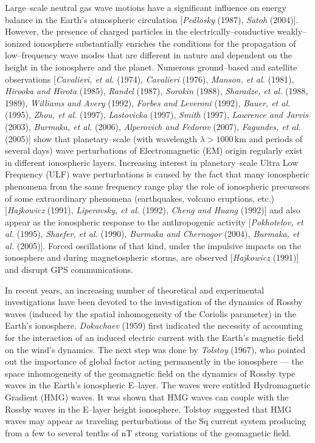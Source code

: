 \documentclass[a4paper,openany,12pt]{report}
\begin{document}
Large--scale neutral gas wave motions have a significant influence on energy balance in the Earth's atmospheric circulation [\emph{Pedlosky} (1987), \emph{Satoh} (2004)]. However, the presence of charged particles in the electrically--conductive weakly--ionized ionosphere substantially enriches the conditions for the propagation of low--frequency wave modes that are different in nature and dependent on the height in the ionosphere and the planet. Numerous ground--based and satellite observations [\emph{Cavalieri, et al.} (1974), \emph{Cavalieri} (1976), \emph{Manson, et al.} (1981), \emph{Hirooka and Hirota} (1985), \emph{Randel} (1987), \emph{Sorokin} (1988), \emph{Sharadze, et al.} (1988, 1989), \emph{Williams and Avery} (1992), \emph{Forbes and Leveroni} (1992), \emph{Bauer, et al.} (1995), \emph{Zhou, et al.} (1997), \emph{Lastovicka} (1997), \emph{Smith} (1997), \emph{Lawrence and Jarvis} (2003), \emph{Burmaka, et al.} (2006), \emph{Alperovich and Fedorov} (2007), \emph{Fagundes, et al.} (2005)] show that planetary--scale (with wavelength $\lambda>1000\,$km and periods of several days) wave perturbations of Electromagnetic (EM) origin regularly exist in different ionospheric layers. Increasing interest in planetary--scale Ultra Low Frequency (ULF) wave perturbations is caused by the fact that many ionospheric phenomena from the same frequency range play the role of ionospheric precursors of some extraordinary phenomena (earthquakes, volcano eruptions, etc.) [\emph{Hajkowicz} (1991), \emph{Liperovsky, et al.} (1992), \emph{Cheng and Huang} (1992)] and also appear as the ionospheric response to the anthropogenic activity [\emph{Pokhotelov, et al.} (1995), \emph{Shaefer, et al.} (1990), \emph{Burmaka and Chernogor} (2004), \emph{Burmaka, et al.} (2005)]. Forced oscillations of that kind, under the impulsive impacts on the ionosphere and during magnetospheric storms, are observed [\emph{Hajkowicz} (1991)] and disrupt GPS communications. 

In recent years, an increasing number of theoretical and experimental investigations have been devoted to the investigation of the dynamics of Rossby waves (induced by the spatial inhomogeneity of the Coriolis parameter) in the Earth's ionosphere. \emph{Dokuchaev} (1959) first indicated the necessity of accounting for the interaction of an induced electric current with the Earth's magnetic field on the wind's dynamics. The next step was done by \emph{Tolstoy} (1967), who pointed out the importance of global factor acting permanently in the ionosphere --- the space inhomogeneity of the geomagnetic field on the dynamics of Rossby type waves in the Earth's ionospheric E--layer. The waves were entitled Hydromagnetic Gradient (HMG) waves. It was shown that HMG waves can couple with the Rossby waves in the E--layer height ionosphere. Tolstoy suggested that HMG waves may appear as traveling perturbations of the Sq current system producing from a few to several tenths of nT strong variations of the geomagnetic field. 
\end{document}
